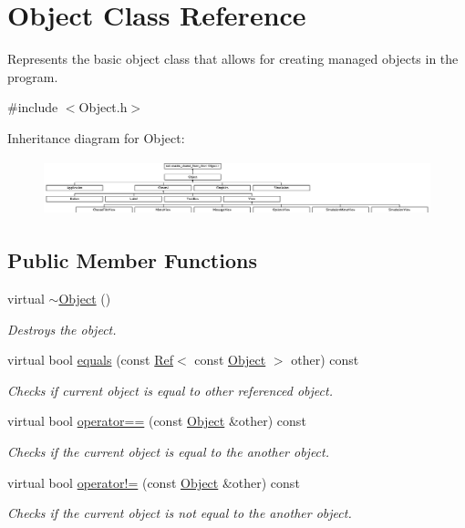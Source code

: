 \hypertarget{class_object}{}\section{Object Class Reference}
\label{class_object}


Represents the basic object class that allows for creating managed objects in the program.  




{\ttfamily \#include $<$Object.\+h$>$}

Inheritance diagram for Object\+:\begin{figure}[H]
\begin{center}
\leavevmode
\includegraphics[height=1.632653cm]{class_object}
\end{center}
\end{figure}
\subsection*{Public Member Functions}
\begin{DoxyCompactItemize}
\item 
virtual \mbox{\hyperlink{class_object_aa3e791419d84c4c346ef9499513b8e00}{$\sim$\+Object}} ()
\begin{DoxyCompactList}\small\item\em Destroys the object. \end{DoxyCompactList}\item 
virtual bool \mbox{\hyperlink{class_object_a8c094a3284ac6d2ebedfa9645e95c35a}{equals}} (const \mbox{\hyperlink{class_ref}{Ref}}$<$ const \mbox{\hyperlink{class_object}{Object}} $>$ other) const
\begin{DoxyCompactList}\small\item\em Checks if current object is equal to other referenced object. \end{DoxyCompactList}\item 
virtual bool \mbox{\hyperlink{class_object_a735820b22a0356fe9afbae9e88b187d6}{operator==}} (const \mbox{\hyperlink{class_object}{Object}} \&other) const
\begin{DoxyCompactList}\small\item\em Checks if the current object is equal to the another object. \end{DoxyCompactList}\item 
virtual bool \mbox{\hyperlink{class_object_afc552cc4f935b62c14c1453041ce4911}{operator!=}} (const \mbox{\hyperlink{class_object}{Object}} \&other) const
\begin{DoxyCompactList}\small\item\em Checks if the current object is not equal to the another object. \end{DoxyCompactList}\end{DoxyCompactItemize}
